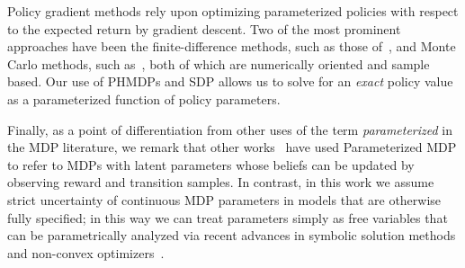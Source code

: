 Policy gradient methods rely upon optimizing parameterized policies with respect to the expected return by gradient descent. 
Two of the most prominent approaches have been the finite-difference methods, such as those of~\parencite{Ng_UAI_2000}, and Monte Carlo methods, such as~\parencite{Sutton_NIPS_1999,Baxter_ISCAS_2000}, both of which are numerically oriented and sample based. Our use of PHMDPs and SDP allows us to solve for an \textit{exact} policy value as a parameterized function of policy parameters.

Finally, as a point of differentiation from other uses of the term \emph{parameterized} in the MDP literature, we remark that other works~\parencite{Doshi-VelezK16,Duff_UMA_2002,Dearden_UAI_1999,Gopalan_COLT_2015} have used Parameterized MDP to refer to MDPs with latent parameters whose beliefs can be updated by observing reward and transition samples. In contrast, in this work we assume strict uncertainty of continuous MDP parameters in models that are otherwise fully specified; in this way we can treat parameters simply as free variables that can be parametrically analyzed via recent advances in symbolic solution methods and non-convex optimizers~\parencite{Gao2013}.


